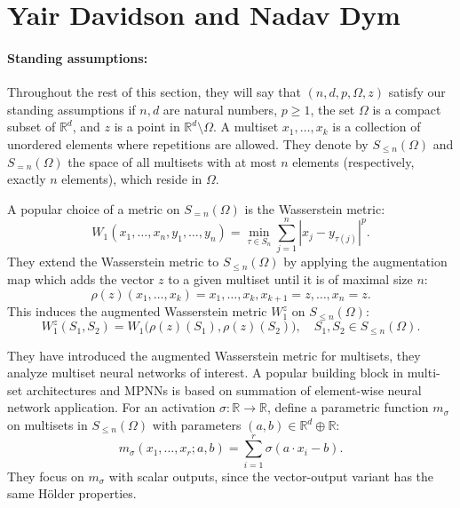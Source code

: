 \documentclass[11pt]{article}\usepackage{amsmath,amssymb,amsthm,bbm}
\newcommand{\1}{\mathbbm{1}}
\begin{document}
\section*{Yair Davidson and Nadav Dym}
\paragraph{Standing assumptions:} Throughout the rest of this section, they will say that $(n,d,p,\Omega,z)$ satisfy our standing assumptions if $n,d$ are natural numbers, $p\ge1$, the set $\Omega$ is a compact subset of $\mathbb{R}^d$, and $z$ is a point in $\mathbb{R}^d\setminus\Omega$. A multiset ${x_1,\ldots,x_k}$ is a collection of unordered elements where repetitions are allowed. They denote by $S_{\le n}(\Omega)$ and $S_{=n}(\Omega)$ the space of all multisets with at most $n$ elements (respectively, exactly $n$ elements), which reside in $\Omega$.

A popular choice of a metric on $S_{=n}(\Omega)$ is the Wasserstein metric:
\begin{equation}
W_1({x_1,\ldots,x_n},{y_1,\ldots,y_n}) = \min_{\tau\in S_n} \sum_{j=1}^n |x_j - y_{\tau(j)}|^p.
\end{equation}
They extend the Wasserstein metric to $S_{\le n}(\Omega)$ by applying the augmentation map which adds the vector $z$ to a given multiset until it is of maximal size $n$:
\begin{equation*}
\rho(z)({x_1,\ldots,x_k}) = {x_1,\ldots,x_k,x_{k+1}=z,\ldots,x_n=z}.
\end{equation*}
This induces the augmented Wasserstein metric $W^z_1$ on $S_{\le n}(\Omega)$:
\begin{equation}
W^z_1(S_1,S_2) = W_1\bigl(\rho(z)(S_1),\rho(z)(S_2)\bigr), \quad S_1,S_2\in S_{\le n}(\Omega).
\end{equation}

They have introduced the augmented Wasserstein metric for multisets, they analyze multiset neural networks of interest. A popular building block in multi-set architectures and MPNNs is based on summation of element-wise neural network application. For an activation $\sigma: \mathbb{R}\to\mathbb{R}$, define a parametric function $m_\sigma$ on multisets in $S_{\le n}(\Omega)$ with parameters $(a,b)\in\mathbb{R}^d\oplus\mathbb{R}$:
\begin{equation}
m_\sigma({x_1,\ldots,x_r};a,b) = \sum_{i=1}^r \sigma(a\cdot x_i - b).
\end{equation}
They focus on $m_\sigma$ with scalar outputs, since the vector-output variant has the same Hölder properties.
\end{document}
